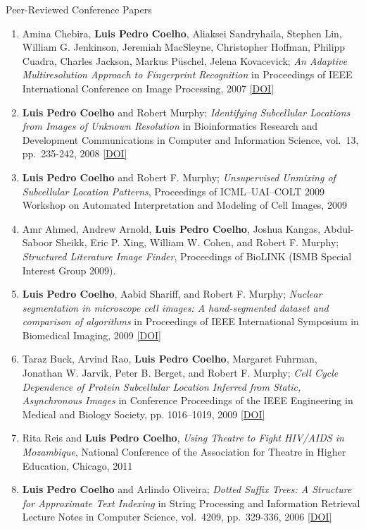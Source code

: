 \documentclass{article}
\renewcommand\subsection[1]{%
    \par\vspace{.1em}%
    {\hspace{1em}\subsubhead #1}%
    \par\vspace{.2em}%
}
\newcommand\showdoi[1]{%
    \href{http://dx.doi.org/#1}{[DOI]}%
}
\begin{document}
\subsection{Peer-Reviewed Conference Papers}
\begin{enumerate}
\item Amina Chebira, \textbf{Luis Pedro Coelho}, Aliaksei Sandryhaila, Stephen
Lin, William G. Jenkinson, Jeremiah MacSleyne, Christopher Hoffman, Philipp
Cuadra, Charles Jackson, Markus P\"uschel, Jelena Kovacevick; \emph{An Adaptive
Multiresolution Approach to Fingerprint Recognition} in Proceedings of IEEE
International Conference on Image Processing, 2007
\showdoi{10.1109/ICIP.2007.4378990}

\item \textbf{Luis Pedro Coelho} and Robert Murphy; \emph{Identifying
Subcellular Locations from Images of Unknown Resolution} in Bioinformatics
Research and Development Communications in Computer and Information Science,
vol.\ 13, pp.\ 235-242, 2008 \showdoi{10.1007/978-3-540-70600-7_18}

\item \textbf{Luis Pedro Coelho} and Robert F. Murphy; \emph{Unsupervised
Unmixing of Subcellular Location Patterns}, Proceedings of ICML--UAI--COLT 2009
Workshop on Automated Interpretation and Modeling of Cell Images, 2009

\item Amr Ahmed, Andrew Arnold, \textbf{Luis Pedro Coelho}, Joshua Kangas,
Abdul-Saboor Sheikk, Eric P. Xing, William W. Cohen, and Robert F. Murphy;
\emph{Structured Literature Image Finder}, Proceedings of BioLINK (ISMB Special
Interest Group 2009).

\item \textbf{Luis Pedro Coelho}, Aabid Shariff, and Robert F. Murphy;
\emph{Nuclear segmentation in microscope cell images: A hand-segmented dataset
and comparison of algorithms} in Proceedings of IEEE International Symposium in
Biomedical Imaging, 2009 \showdoi{10.1109/ISBI.2009.5193098}

\item Taraz Buck, Arvind Rao, \textbf{Luis Pedro Coelho}, Margaret Fuhrman,
Jonathan W. Jarvik, Peter B. Berget, and Robert F. Murphy; \emph{Cell Cycle
Dependence of Protein Subcellular Location Inferred from Static, Asynchronous
Images} in Conference Proceedings of the IEEE Engineering in Medical and
Biology Society, pp. 1016--1019, 2009 \showdoi{10.1109/IEMBS.2009.5332888}

\item Rita Reis and \textbf{Luis Pedro Coelho}, \emph{Using Theatre to Fight
HIV/AIDS in Mozambique}, National Conference of the Association for Theatre in
Higher Education, Chicago, 2011

\item \textbf{Luis Pedro Coelho} and Arlindo Oliveira; \emph{Dotted Suffix
Trees: A Structure for Approximate Text Indexing} in String Processing and
Information Retrieval Lecture Notes in Computer Science, vol.\ 4209, pp.\
329-336, 2006 \showdoi{10.1007/11880561_27}
\end{enumerate}
\end{document}
